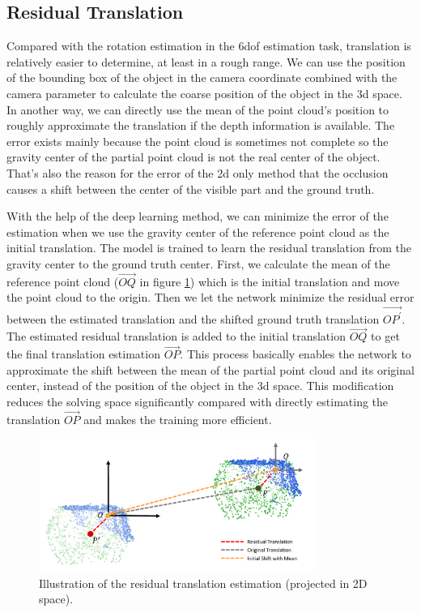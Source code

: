 \documentclass[12pt,DIV14,BCOR12mm,a4paper,footinclude=false,headinclude,parskip=half-,twoside,openright,cleardoublepage=empty,toc=index,bibliography=totoc,listof=totoc]{scrreprt}
\numberwithin{equation}{chapter}
\begin{document}
\subsection{Residual Translation}\label{sec:res_t}
Compared with the rotation estimation in the \gls{6dof} estimation task, translation is relatively easier to determine, at least in a rough range. We can use the position of the bounding box of the object in the camera coordinate combined with the camera parameter to calculate the coarse position of the object in the \gls{3d} space. In another way, we can directly use the mean of the point cloud's position to roughly approximate the translation if the depth information is available. The error exists mainly because the point cloud is sometimes not complete so the gravity center of the partial point cloud is not the real center of the object. That's also the reason for the error of the \gls{2d} only method that the occlusion causes a shift between the center of the visible part and the ground truth.

With the help of the deep learning method, we can minimize the error of the estimation when we use the gravity center of the reference point cloud as the initial translation. The model is trained to learn the residual translation from the gravity center to the ground truth center. First, we calculate the mean of the reference point cloud ($\overrightarrow{OQ}$ in figure \ref{img:res_t}) which is the initial translation and move the point cloud to the origin. Then we let the network minimize the residual error between the estimated translation and the shifted ground truth translation $\overrightarrow{OP^{'}}$. The estimated residual translation is added to the initial translation $\overrightarrow{OQ}$ to get the final translation estimation $\overrightarrow{OP} $. This process basically enables the network to approximate the shift between the mean of the partial point cloud and its original center, instead of the position of the object in the \gls{3d} space. This modification reduces the solving space significantly compared with directly estimating the translation $\overrightarrow{OP} $ and makes the training more efficient.

\begin{figure}[h]
	\centering
	\includegraphics[width=0.8\textwidth]{img/res_t.pdf}
	\caption{Illustration of the residual translation estimation (projected in 2D space).}
	\label{img:res_t}
\end{figure}
\end{document}
